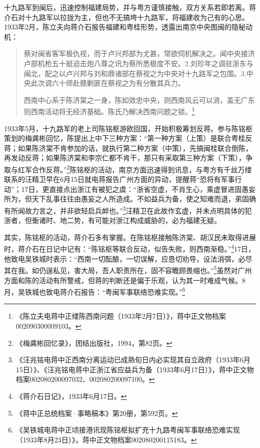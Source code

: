 十九路军到闽后，迅速控制福建局势，并与粤方谨慎接触，双方关系若即若离。蒋介石对十九路军以拉拢为主，但也不无搞垮十九路军，将福建收为己有的心思。1933年2月，陈立夫向蒋介石报告福建和粤桂形势，透露出南京中央图闽的隐秘动机：

\begin{quote}

蔡对闽省客军极仇视，而于卢兴邦部为尤甚，常欲伺机解决之。闻中央接济卢部机枪五十挺迫击炮八尊之讯为蔡所悉极度不安。2.刘珍年之调驻浙东与闽北，配之以卢兴邦与刘和鼎诸部在蔡视之为中央对十九路军之包围。3.中央此次调六十师赴赣剿匪在蔡视之为有分散其兵力。

西南中心系于陈济棠之一身，陈如效忠中央，则西南风云可以消，盖无广东则西南活动将无经济基础。陈氏乃解决西南问题之锁。\footnote{《陈立夫电蒋中正缕陈西南问题（1933年2月7日）》，蒋中正文物档案002090300009103。}
\end{quote}


1933年5月，十九路军的老上司陈铭枢游欧回国，开始积极筹划反蒋。参与陈铭枢策划的梅龚彬回忆，陈提出上中下三种方案：“第一种方案（上策）是联合粤桂反蒋；如果陈济棠不肯参加的话，就执行第二种方案（中策），先搞闽桂联合倒陈，再发动反蒋；如果陈济棠和李宗仁都不肯干，那只有采取第三种方案（下策），争取与红军合作反蒋。”\footnote{《梅龚彬回忆录》，团结出版社，1994，第82页。}陈铭枢的活动，南京方面迅速得到讯息，与粤方有千丝万缕联系的汪精卫早在6月15日就电蒋报告广州方面的异动，提醒蒋“恐将有军事行动”；17日，更直接点出浙江有被犯之虞：“浙省空虚，不肖生心，乘虚冒进固愚妄所为，但天下乱事往往由愚妄之人所造成。不如益兵为备，使之知难而退，弟固确有所闻故力言之，并非欲轻启兵衅也。”\footnote{《汪兆铭电蒋中正西南分离运动已成熟旬日内必实现其自立政府（1933年6月15日）》、《汪兆铭电蒋中正浙江省应益兵为备（1933年6月17日）》，蒋中正文物档案002080200097032、002080200097100。}汪精卫在此故作玄虚，并未点明具体的犯浙者，但衡诸时、地二势，有可能对浙江构成威胁的，必为福建无疑。


其实，陈铭枢的活动，蒋介石多有掌握。在陈铭枢接触陈济棠、胡汉民未取得进展时，蒋介石在日记中记有：“陈铭枢等联合反动，似告失败，则西南渐稳。”\footnote{《蒋介石日记》，1933年6月17日。}17日，他致电吴铁城时表示：“西南一切酝酿，一切误解，应恳切劝导，设法消弭，必尽其在我。如仍逞私见，害大局，吾人职责所在，固不容瞻顾畏缩也。”\footnote{《蒋中正总统档案·事略稿本》第20册，第592页。}虽然对广州方面和陈的活动有所警戒，但蒋的判断还是偏于乐观，认为其一时难成气候。8月，吴铁城也致电蒋介石报告：“粤闽军事联络恐难实现。”\footnote{《吴铁城电蒋中正顷接港讯现陈铭枢拟扩充十九路粤闽军事联络恐难实现（1933年8月23日）》，蒋中正文物档案002080200115183。}


